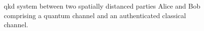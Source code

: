 \begin{figure}[htb]
	\centering
	
	\caption{\Gls{qkd} system between two spatially distanced parties Alice and Bob comprising a quantum channel and an authenticated classical channel.}
\end{figure}
